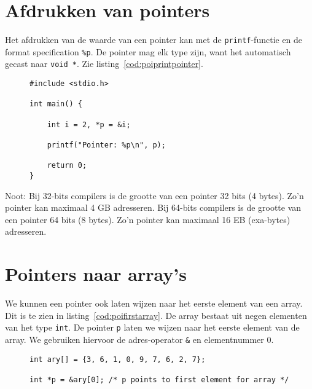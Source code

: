 \section{Afdrukken van pointers}
\label{sec:afdrukkenvanpointers}
Het afdrukken van de waarde van een pointer kan met de \texttt{printf}-functie en de format specification \texttt{\%p}. De pointer mag elk type zijn, want het automatisch gecast naar \texttt{void *}. Zie listing~\ref{cod:poiprintpointer}.

\begin{figure}[!ht]
\begin{lstlisting}[caption=Afdrukken van een pointer.,label=cod:poiprintpointer]
#include <stdio.h>

int main() {

    int i = 2, *p = &i;

    printf("Pointer: %p\n", p);

    return 0;
}
\end{lstlisting}
\end{figure}

Noot: Bij 32-bits compilers is de grootte van een pointer 32 bits (4 bytes). Zo'n pointer kan maximaal 4 GB adresseren. Bij 64-bits compilers is de grootte van een pointer 64 bits (8 bytes). Zo'n pointer kan maximaal 16 EB (exa-bytes) adresseren.


\section{Pointers naar array's}
\label{sec:pointersnaararrays}
We kunnen een pointer ook laten wijzen naar het eerste element van een array. Dit is te zien in listing~\ref{cod:poifirstarray}. De array bestaat uit negen elementen van het type \texttt{int}. De pointer \texttt{p} laten we wijzen naar het eerste element van de array. We gebruiken hiervoor de adres-operator \texttt{\&} en elementnummer 0.

\begin{figure}[!ht]
\begin{lstlisting}[caption=Een pointer naar het eerste element van een array.,label=cod:poifirstarray]
int ary[] = {3, 6, 1, 0, 9, 7, 6, 2, 7};

int *p = &ary[0]; /* p points to first element for array */
\end{lstlisting}
\end{figure}

